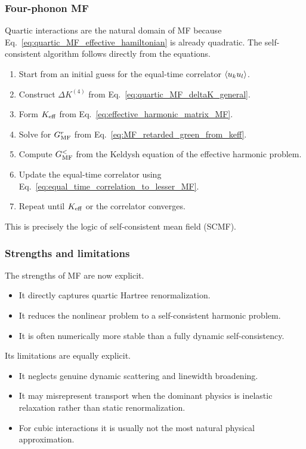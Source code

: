 \subsubsection{Four-phonon MF}
Quartic interactions are the natural domain of MF because Eq.~\eqref{eq:quartic_MF_effective_hamiltonian} is already quadratic. The self-consistent algorithm follows directly from the equations.
\begin{enumerate}[label=\arabic*.]
\item Start from an initial guess for the equal-time correlator $\left\langle u_k u_l \right\rangle$.
\item Construct $\Delta K^{(4)}$ from Eq.~\eqref{eq:quartic_MF_deltaK_general}.
\item Form $K_{\rm eff}$ from Eq.~\eqref{eq:effective_harmonic_matrix_MF}.
\item Solve for $G^r_{\rm MF}$ from Eq.~\eqref{eq:MF_retarded_green_from_keff}.
\item Compute $G^<_{\rm MF}$ from the Keldysh equation of the effective harmonic problem.
\item Update the equal-time correlator using Eq.~\eqref{eq:equal_time_correlation_to_lesser_MF}.
\item Repeat until $K_{\rm eff}$ or the correlator converges.
\end{enumerate}
This is precisely the logic of self-consistent mean field (SCMF).

\subsubsection{Strengths and limitations}
The strengths of MF are now explicit.
\begin{itemize}
\item It directly captures quartic Hartree renormalization.
\item It reduces the nonlinear problem to a self-consistent harmonic problem.
\item It is often numerically more stable than a fully dynamic self-consistency.
\end{itemize}
Its limitations are equally explicit.
\begin{itemize}
\item It neglects genuine dynamic scattering and linewidth broadening.
\item It may misrepresent transport when the dominant physics is inelastic relaxation rather than static renormalization.
\item For cubic interactions it is usually not the most natural physical approximation.
\end{itemize}

